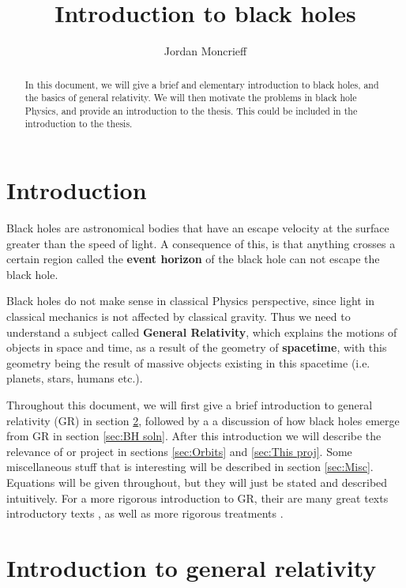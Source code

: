 \documentclass{article}
\title{Introduction to black holes}
\author{Jordan Moncrieff}
\begin{document}
\maketitle

\begin{abstract}
In this document, we will give a brief and elementary introduction to black holes, and the basics of general relativity. We will then motivate the problems in black hole Physics, and provide an introduction to the thesis. This could be included in the introduction to the thesis.

\end{abstract}

\section{Introduction}

Black holes are astronomical bodies that have an escape velocity at the surface greater than the speed of light. A consequence of this, is that anything crosses a certain region called the \textbf{event horizon} of the black hole can not escape the black hole. 

Black holes do not make sense in classical Physics perspective, since light in classical mechanics is not affected by classical gravity. Thus we need to understand a subject called \textbf{General Relativity}, which explains the motions of objects in space and time, as a result of the geometry of \textbf{spacetime}, with this geometry being the result of massive objects existing in this spacetime (i.e. planets, stars, humans etc.). 

Throughout this document, we will first give a brief introduction to general relativity (GR) in section \ref{sec:Intro to GR}, followed by a a discussion of how black holes emerge from GR in section \ref{sec:BH soln}. After this introduction we will describe the relevance of or project in sections \ref{sec:Orbits} and \ref{sec:This proj}. Some miscellaneous stuff that is interesting will be described in section \ref{sec:Misc}. Equations will be given throughout, but they will just be stated and described intuitively. For a more rigorous introduction to GR, their are many great texts introductory texts \cite{carroll2019spacetime, hartle2003gravity}, as well as more rigorous treatments \cite{wald2010general}.

\section{Introduction to general relativity}\label{sec:Intro to GR}
\end{document}
